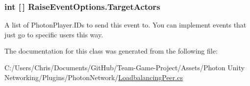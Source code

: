 \subsubsection[{\texorpdfstring{Target\+Actors}{TargetActors}}]{\setlength{\rightskip}{0pt plus 5cm}int \mbox{[}$\,$\mbox{]} Raise\+Event\+Options.\+Target\+Actors}\hypertarget{class_raise_event_options_a2efd7020aa43343d1f07a3f8227deb6a}{}\label{class_raise_event_options_a2efd7020aa43343d1f07a3f8227deb6a}


A list of Photon\+Player.\+I\+Ds to send this event to. You can implement events that just go to specific users this way.



The documentation for this class was generated from the following file\+:\begin{DoxyCompactItemize}
\item 
C\+:/\+Users/\+Chris/\+Documents/\+Git\+Hub/\+Team-\/\+Game-\/\+Project/\+Assets/\+Photon Unity Networking/\+Plugins/\+Photon\+Network/\hyperlink{_loadbalancing_peer_8cs}{Loadbalancing\+Peer.\+cs}\end{DoxyCompactItemize}
